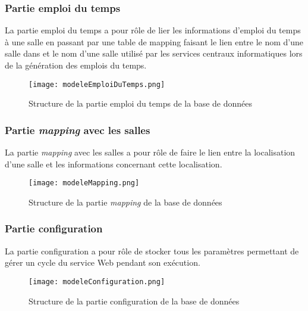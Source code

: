 \begin{appendices}
\subsubsection{Partie emploi du temps}

La partie emploi du temps a pour r\^ole de lier les informations d'emploi du temps \`a une salle en passant par une table de mapping faisant le lien entre le nom d'une salle dans {\YuukouII} et le nom d'une salle utilis\'e par les services centraux informatiques lors de la g\'en\'eration des emplois du temps.

\clearpage

\begin{figure}[!ht]
	\centering
	\texttt{[image: modeleEmploiDuTemps.png]}
	\caption{Structure de la partie emploi du temps de la base de donn\'ees}
	\label{annexe:modeleEmploiDuTemps}

\end{figure}

\subsubsection{Partie \textit{mapping} avec les salles}

La partie \textit{mapping} avec les salles a pour r\^ole de faire le lien entre la localisation d'une salle et les informations concernant cette localisation.

\begin{figure}[!ht]
	\centering
	\texttt{[image: modeleMapping.png]}
	\caption{Structure de la partie \textit{mapping} de la base de donn\'ees}
	\label{annexemodeleMapping}

\end{figure}

\subsubsection{Partie configuration}

La partie configuration a pour r\^ole de stocker tous les param\`etres permettant de g\'erer un cycle du service Web pendant son ex\'ecution.

\begin{figure}[!ht]
	\centering
	\texttt{[image: modeleConfiguration.png]}
	\caption{Structure de la partie configuration de la base de donn\'ees}
	\label{annexe:modeleConfiguration}

\end{figure}


\end{appendices}
